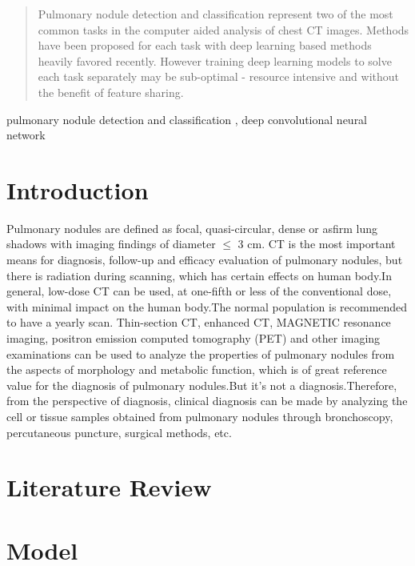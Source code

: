 \documentclass[conference]{IEEEtran}
\begin{document}
\maketitle
\begin{CJK}{UTF8}{gbsn}
\begin{abstract}
    Pulmonary nodule detection and
    classification represent two of the most common tasks in the computer
    aided analysis of chest CT images. Methods have been proposed for each
    task with deep learning based methods heavily favored recently.
    However training deep learning models to solve each task separately may be
    sub-optimal - resource intensive and without the benefit of feature sharing. 
\end{abstract}

\begin{IEEEkeywords}
    pulmonary nodule detection and classification
    , deep convolutional neural network
\end{IEEEkeywords}

\section{Introduction}
Pulmonary nodules are defined as focal, quasi-circular, dense or asfirm lung shadows with imaging findings of diameter $\leq$ 3 cm. \cite{wang2019}
CT is the most important means for diagnosis, follow-up and efficacy evaluation of pulmonary nodules, but there is radiation during scanning, which has certain effects on human body.In general, low-dose CT can be used, at one-fifth or less of the conventional dose, with minimal impact on the human body.The normal population is recommended to have a yearly scan.
Thin-section CT, enhanced CT, MAGNETIC resonance imaging, positron emission computed tomography (PET) and other imaging examinations can be used to analyze the properties of pulmonary nodules from the aspects of morphology and metabolic function, which is of great reference value for the diagnosis of pulmonary nodules.But it's not a diagnosis.Therefore, from the perspective of diagnosis, clinical diagnosis can be made by analyzing the cell or tissue samples obtained from pulmonary nodules through bronchoscopy, percutaneous puncture, surgical methods, etc.
\section{Literature Review}



\section{Model}

\end{CJK}
\end{document}
